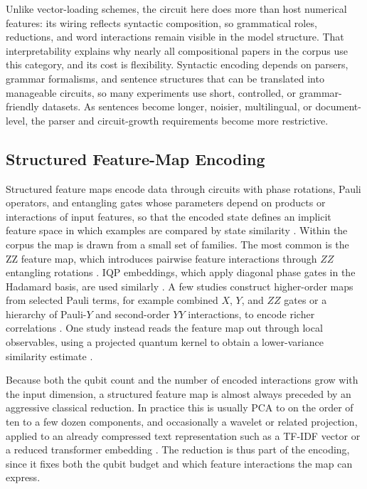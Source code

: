 \documentclass{ieeeaccess}
\begin{document}
Unlike vector-loading schemes, the circuit here does more than host numerical features: its wiring reflects syntactic composition, so grammatical roles, reductions, and word interactions remain visible in the model structure. That interpretability explains why nearly all compositional papers in the corpus use this category, and its cost is flexibility. Syntactic encoding depends on parsers, grammar formalisms, and sentence structures that can be translated into manageable circuits, so many experiments use short, controlled, or grammar-friendly datasets. As sentences become longer, noisier, multilingual, or document-level, the parser and circuit-growth requirements become more restrictive.

\subsection{Structured Feature-Map Encoding}
\label{subsec:iqp_encoding}

Structured feature maps encode data through circuits with phase rotations, Pauli operators, and entangling gates whose parameters depend on products or interactions of input features, so that the encoded state defines an implicit feature space in which examples are compared by state similarity \cite{schuld2019quantum}. Within the corpus the map is drawn from a small set of families. The most common is the ZZ feature map, which introduces pairwise feature interactions through $ZZ$ entangling rotations \cite{widdows_near-term_2024,baik_neural_2025,sunkavalli_experimentation_2024}. IQP embeddings, which apply diagonal phase gates in the Hadamard basis, are used similarly \cite{djemmal_arabert-qc_2025,ruskanda_quantum-enhanced_2023}. A few studies construct higher-order maps from selected Pauli terms, for example combined $X$, $Y$, and $ZZ$ gates or a hierarchy of Pauli-$Y$ and second-order $YY$ interactions, to encode richer correlations \cite{katyayan_supervised_2023,ruskanda_quantum-enhanced_2023}. One study instead reads the feature map out through local observables, using a projected quantum kernel to obtain a lower-variance similarity estimate \cite{keith-norambuena_quantum_2026}.

Because both the qubit count and the number of encoded interactions grow with the input dimension, a structured feature map is almost always preceded by an aggressive classical reduction. In practice this is usually PCA to on the order of ten to a few dozen components, and occasionally a wavelet or related projection, applied to an already compressed text representation such as a TF-IDF vector or a reduced transformer embedding \cite{mohammad_masum_hybrid_2023,djemmal_arabert-qc_2025,jagatheesan_quantum_2026}. The reduction is thus part of the encoding, since it fixes both the qubit budget and which feature interactions the map can express.
\end{document}

